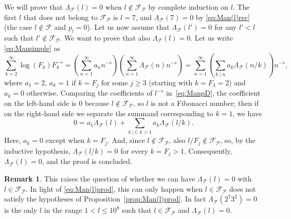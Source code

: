 \documentclass[11pt, a4paper]{article}
\newcommand{\calF}{\mathcal{F}}
\newcommand{\manF}{\Lambda_{\mathcal{F}}}
\newcommand{\Fp}{\mathcal{F}_{\mathcal{P}}}
\theoremstyle{plain}
\theoremstyle{definition}
\newtheorem{remark}[theorem]{Remark}
\begin{document}

We will prove that $\manF(l) = 0$ when $l \notin \Fp$ by complete induction on $l$.
The first $l$ that does not belong to $\Fp$ is $l=7$, and $\manF(7)=0$ by \eqref{eq:Man(l)rec} (the case $l \notin \calF$ and $p_l=0$). Let us now assume that $\manF(l') = 0$ for any $l'<l$ such that  $l' \notin \Fp$. We want to prove that also $\manF(l) = 0$. Let us write \eqref{eq:Mansimple} as
\begin{equation}
\label{eq:ManpD}
\sum_{k=2}^\infty \log(F_k) F_k^{-s} 
= \left(\sum_{n=1}^\infty a_{n} n^{-s}\right) \left(\sum_{n=1}^\infty \manF(n) n^{-s}\right)
= \sum_{n=1}^\infty \left( \sum_{k \mid n} a_k \manF(n/k) \right) n^{-s},
\end{equation}
where $a_1=2$, $a_k=1$ if $k=F_j$ for some $j\ge3$ (starting with $k=F_3=2$) and $a_k=0$ otherwise.
Comparing the coefficients of $l^{-s}$ in~\eqref{eq:ManpD}, the coefficient on the left-hand side is $0$ because $l \notin \Fp$, so $l$ is not a Fibonacci number; then if on the right-hand side we separate the summand corresponding to $k=1$, we have
\[
0 = a_1 \manF(l) + \sum_{k \mid l,\, k > 1} a_k \manF(l/k).
\]
Here, $a_k=0$ except when $k=F_j$. And, since $l \notin \Fp$, also $l/F_j \notin \Fp$, so, by the inductive hypothesis, $\manF(l/k) = 0$ for every $k=F_j>1$. Consequently, $\manF(l)=0$, and the proof is concluded.

\begin{remark}
This raises the question of whether we can have $\manF(l) = 0$ with $l \in \Fp$. 
In light of \eqref{eq:Man(l)prod}, this can only happen when $l \in \Fp$ does not satisfy the hypotheses of Proposition~\ref{prop:Man(l)prod}. In fact $\manF(2^{7}3^{2}) = 0$ is the only $l$ in the range $1<l\le10^8$ such that $l \in \Fp$ and $\manF(l) = 0$.
\end{remark}
\end{document}
